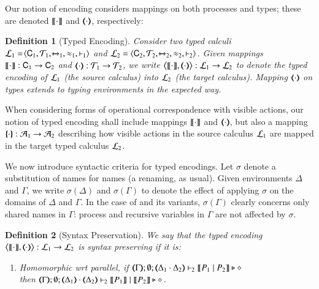 \documentclass[preprint,11pt]{elsarticle}
\newtheorem{definition}{Definition}[section]
\begin{document}
{{Our notion of encoding considers mappings on both processes 
and types; these are denoted $\llbracket\cdot\rrbracket$ and $(\!\!\langle\cdot\rangle\!\!)$, respectively: %

\begin{definition}[Typed Encoding]%
\label{def:tenc}
        Consider two typed calculi
        $\mathcal{L}_1=\!\langle \mathsf{C}_1, {\cal{T}}_1, \xmapsto{~}_1, \approx_1, \vdash_1 \rangle$
        and
        $\mathcal{L}_2=\langle \mathsf{C}_2, {\cal{T}}_2, \xmapsto{~}_2, \approx_2, \vdash_2 \rangle$.
	Given mappings $\llbracket\cdot\rrbracket: \mathsf{C}_1 \to \mathsf{C}_2$ and
	$(\!\!\langle\cdot\rangle\!\!): {\cal{T}}_1 \to {\cal{T}}_2$, 
	we write 
		$\big\langle \llbracket\cdot\rrbracket, (\!\!\langle\cdot\rangle\!\!)\big\rangle : 
	\mathcal{L}_1 \to \mathcal{L}_2$ to denote the \emph{typed encoding} of $\mathcal{L}_1$ (the \emph{source calculus}) into $\mathcal{L}_2$ (the \emph{target  calculus}).
Mapping $(\!\!\langle\cdot\rangle\!\!)$ on types extends to typing
environments in the expected way. %
\end{definition}


When considering forms of operational correspondence with visible actions, 
our notion of typed encoding shall include mappings $\llbracket\cdot\rrbracket$ and $(\!\!\langle\cdot\rangle\!\!)$, but also
a  mapping  $\{\!\!\{\cdot\}\!\!\}:\mathcal{A}_1 \to \mathcal{A}_2$ 
describing how visible actions in the source calculus $\mathcal{L}_1$ are mapped in the target typed calculus $\mathcal{L}_2$.


We now introduce syntactic criteria for typed encodings.
Let $\sigma$ denote a substitution of names for names (a renaming, as usual). Given environments $\Delta$ and $\Gamma$,
we write $\sigma(\Delta)$ and $\sigma(\Gamma)$ to denote the effect of applying $\sigma$ on the 
domains of $\Delta$ and $\Gamma$.
In the case of \HOp and its variants,  $\sigma(\Gamma)$ clearly concerns only shared names in $\Gamma$: process and recursive variables in $\Gamma$ are not affected by $\sigma$. 


\begin{definition}[Syntax Preservation]%
	\label{def:sep}
	We say that the
	typed encoding 
	$\big\langle \llbracket\cdot\rrbracket, (\!\!\langle\cdot\rangle\!\!)\big\rangle: \mathcal{L}_1 \to \mathcal{L}_2$ is \emph{syntax preserving}
	if it is:
	
	\begin{enumerate}[1.]
		\item	\emph{Homomorphic wrt parallel},   if 
		$\mapt{\Gamma}; \emptyset; \mapt{\Delta_1 \cat \Delta_2} \proves_2 \map{P_1 \Par P_2} \hastype \Proc$ \\
		then 
		$\mapt{\Gamma}; \emptyset; \mapt{\Delta_1} \cat \mapt{\Delta_2} \proves_2 \map{P_1} \Par \map{P_2} \hastype \Proc$.


\end{enumerate}
\end{definition}}}
\end{document}
